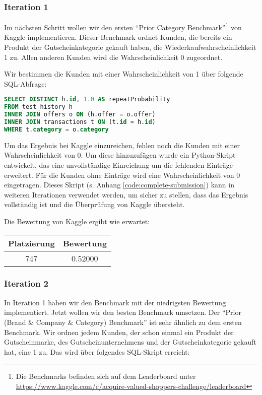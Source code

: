 \subsubsection{Iteration 1}

Im nächsten Schritt wollen wir den ersten "`Prior Category Benchmark"'\footnote{Die Benchmarks befinden sich auf dem Leaderboard unter \\
\url{https://www.kaggle.com/c/acquire-valued-shoppers-challenge/leaderboard}} von Kaggle implementieren.
Dieser Benchmark ordnet Kunden, die bereits ein Produkt der Gutscheinkategorie gekauft haben, 
die Wiederkaufwahrscheinlichkeit 1 zu. Allen anderen Kunden wird die Wahrscheinlichkeit 0 zugeordnet.

Wir bestimmen die Kunden mit einer Wahrscheinlichkeit von 1 über folgende SQL-Abfrage:
\begin{lstlisting}[language=SQL]
SELECT DISTINCT h.id, 1.0 AS repeatProbability
FROM test_history h 
INNER JOIN offers o ON (h.offer = o.offer)
INNER JOIN transactions t ON (t.id = h.id)
WHERE t.category = o.category
\end{lstlisting}

Um das Ergebnis bei Kaggle einzureichen, fehlen noch die Kunden mit einer Wahrscheinlichkeit von 0.
Um diese hinzuzufügen wurde ein Python-Skript entwickelt, das eine unvollständige Einreichung
um die fehlenden Einträge erweitert. Für die Kunden ohne Einträge wird eine Wahrscheinlichkeit von 0 eingetragen.
Dieses Skript (s. Anhang \ref{code:complete-submission}) kann in weiteren Iterationen verwendet werden,
um sicher zu stellen, dass das Ergebnis vollständig ist und die Überprüfung von Kaggle übersteht. 

Die Bewertung von Kaggle ergibt wie erwartet:

\begin{tabular}{|c|c|}
	\hline \textbf{Platzierung} & \textbf{Bewertung} \\ 
	\hline 747 & 0.52000  \\ 
	\hline 
\end{tabular}

\subsubsection{Iteration 2}

In Iteration 1 haben wir den Benchmark mit der niedrigsten Bewertung implementiert. Jetzt wollen wir 
den besten Benchmark umsetzen. Der "`Prior (Brand \& Company \& Category) Benchmark"' ist sehr ähnlich
zu dem ersten Benchmark. Wir ordnen jedem Kunden, der schon einmal ein Produkt der Gutscheinmarke,
des Gutscheinunternehmens und der Gutscheinkategorie gekauft hat, eine 1 zu. 
Das wird über folgendes SQL-Skript erreicht:


